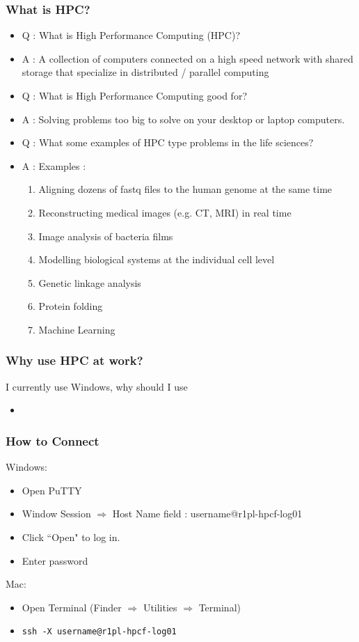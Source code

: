 \documentclass{beamer}
\newcommand{\code}[1]{\colorbox{codegray}{\texttt{#1}}}
\begin{document}
\begin{frame}
\frametitle{What is HPC?}
\begin{itemize}
    \item Q : What is High Performance Computing (HPC)?
    \pause
    \item A : A collection of computers connected on a high speed network with
              shared storage that specialize in distributed / parallel computing
    \bigskip
    \item Q : What is High Performance Computing good for?
    \pause
    \item A : Solving problems too big to solve on your desktop or laptop computers.
    \bigskip
    \item Q : What some examples of HPC type problems in the life sciences?
    \pause
    \item A : Examples : 
    \begin{enumerate}
        \item Aligning dozens of fastq files to the human genome at the same time
        \pause
        \item Reconstructing medical images (e.g. CT, MRI) in real time
        \pause
        \item Image analysis of bacteria films
        \pause
        \item Modelling biological systems at the individual cell level
        \pause
        \item Genetic linkage analysis
        \pause
        \item Protein folding 
        \pause
        \item Machine Learning
    \end{enumerate}
    \bigskip
\end{itemize}
\end{frame}


\begin{frame}
\frametitle{Why use HPC at work?}
I currently use Windows, why should I use 
\begin{itemize}
    \item 
\end{itemize}
\end{frame}


\begin{frame}
\frametitle{How to Connect}
Windows:
\begin{itemize}
    \item Open PuTTY
    \item Window Session $\Rightarrow$ Host Name field : username@r1pl-hpcf-log01
    \item Click ``Open" to log in.
    \item Enter password
\end{itemize}

Mac:
\begin{itemize}
    \item Open Terminal (Finder $\Rightarrow$ Utilities $\Rightarrow$ Terminal)
    \item \code{ssh -X username@r1pl-hpcf-log01}
\end{itemize}

\end{frame}
\end{document}
